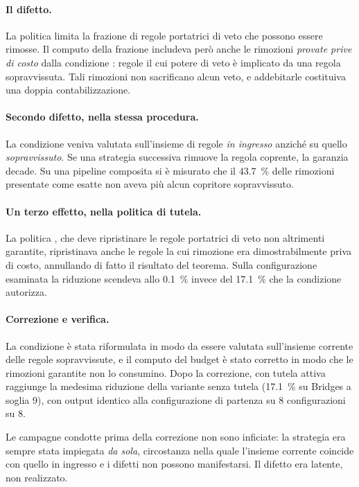 \paragraph{Il difetto.} La politica  limita la frazione di regole portatrici di veto
che possono essere rimosse. Il computo della frazione includeva però anche le rimozioni
\emph{provate prive di costo} dalla condizione \Vtwo{}: regole il cui potere di veto è implicato
da una regola sopravvissuta. Tali rimozioni non sacrificano alcun veto, e addebitarle costituiva
una doppia contabilizzazione.

\paragraph{Secondo difetto, nella stessa procedura.} La condizione \Vtwo{} veniva valutata
sull'insieme di regole \emph{in ingresso} anziché su quello \emph{sopravvissuto}. Se una strategia
successiva rimuove la regola coprente, la garanzia decade. Su una pipeline composita si è
misurato che il \SI{43.7}{\percent} delle rimozioni presentate come esatte non aveva più alcun
copritore sopravvissuto.

\paragraph{Un terzo effetto, nella politica di tutela.} La politica , che deve
ripristinare le regole portatrici di veto non altrimenti garantite, ripristinava anche le regole
la cui rimozione era dimostrabilmente priva di costo, annullando di fatto il risultato del
teorema. Sulla configurazione esaminata la riduzione scendeva allo \SI{0.1}{\percent} invece del
\SI{17.1}{\percent} che la condizione autorizza.

\paragraph{Correzione e verifica.} La condizione \Vtwo{} è stata riformulata in modo da essere
valutata sull'insieme corrente delle regole sopravvissute, e il computo del budget è stato
corretto in modo che le rimozioni garantite non lo consumino. Dopo la correzione,
 con tutela attiva raggiunge la medesima riduzione della variante senza tutela
(\SI{17.1}{\percent} su Bridges a soglia 9), con output identico alla configurazione di partenza
su \num{8} configurazioni su \num{8}.

\begin{remark}
Le campagne condotte prima della correzione non sono inficiate: la strategia  era
sempre stata impiegata \emph{da sola}, circostanza nella quale l'insieme corrente coincide con
quello in ingresso e i difetti non possono manifestarsi. Il difetto era latente, non realizzato.
\end{remark}

